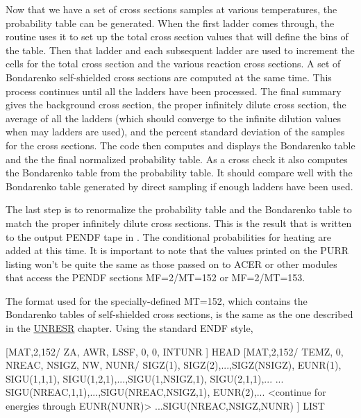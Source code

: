 Now that we have a set of cross sections samples at various
temperatures, the probability table can be generated.  When the first
ladder comes through, the routine uses it to set up the total
cross section values that will define the bins of the table.
Then that ladder and each subsequent ladder are used to increment
the cells for the total cross section and the various reaction
cross sections.  A set of Bondarenko self-shielded cross sections
are computed at the same time.  This process continues until all the
ladders have been processed.  The final summary gives the background
cross section, the proper infinitely dilute cross section, the
average of all the ladders (which should converge to the infinite
dilution values when may ladders are used), and the percent standard
deviation of the samples for the cross sections.  The code then
computes and displays the Bondarenko table and the the final
normalized probability table.  As a cross check it also computes
the Bondarenko table from the probability table.  It should compare
well with the Bondarenko table generated by direct sampling if
enough ladders have been used.

The last step is to renormalize the probability table and the
Bondarenko table to match the proper infinitely dilute cross sections.
This is the result that is written to the output PENDF tape in
.  The conditional probabilities for heating are added
at this time.  It is important to note that the values printed on
the PURR listing won't be quite the same as those passed on to ACER
or other modules that access the PENDF sections MF=2/MT=152 or MF=2/MT=153.

The format used for the specially-defined MT=152, which contains the
Bondarenko tables of self-shielded cross sections, is the same as the
one described in the \hyperlink{sUNRESRhy}{UNRESR} chapter.  Using
the standard ENDF style,

\small
\begin{ccode}

[MAT,2,152/ ZA, AWR, LSSF, 0, 0, INTUNR ] HEAD
[MAT,2,152/ TEMZ, 0, NREAC, NSIGZ, NW, NUNR/
            SIGZ(1), SIGZ(2),...,SIGZ(NSIGZ),
            EUNR(1),
            SIGU(1,1,1), SIGU(1,2,1),...,SIGU(1,NSIGZ,1),
            SIGU(2,1,1),...
            ...
            SIGU(NREAC,1,1),...,SIGU(NREAC,NSIGZ,1),
            EUNR(2),...
              <continue for energies through EUNR(NUNR)>
            ...SIGU(NREAC,NSIGZ,NUNR) ] LIST

\end{ccode}
\normalsize

